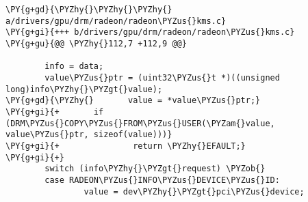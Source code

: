 \begin{Verbatim}[commandchars=\\\{\}]
\PY{g+gd}{\PYZhy{}\PYZhy{}\PYZhy{} a/drivers/gpu/drm/radeon/radeon\PYZus{}kms.c}
\PY{g+gi}{+++ b/drivers/gpu/drm/radeon/radeon\PYZus{}kms.c}
\PY{g+gu}{@@ \PYZhy{}112,7 +112,9 @@}

        info = data;
        value\PYZus{}ptr = (uint32\PYZus{}t *)((unsigned long)info\PYZhy{}\PYZgt{}value);
\PY{g+gd}{\PYZhy{}       value = *value\PYZus{}ptr;}
\PY{g+gi}{+       if (DRM\PYZus{}COPY\PYZus{}FROM\PYZus{}USER(\PYZam{}value, value\PYZus{}ptr, sizeof(value)))}
\PY{g+gi}{+               return \PYZhy{}EFAULT;}
\PY{g+gi}{+}
        switch (info\PYZhy{}\PYZgt{}request) \PYZob{}
        case RADEON\PYZus{}INFO\PYZus{}DEVICE\PYZus{}ID:
                value = dev\PYZhy{}\PYZgt{}pci\PYZus{}device;
\end{Verbatim}
